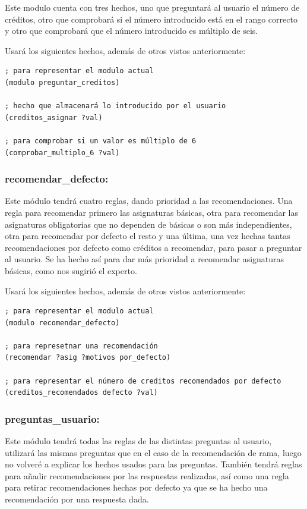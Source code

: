 \documentclass[12pt, spanish]{article}
\begin{document}
Este modulo cuenta con tres hechos, uno que preguntará al usuario el número de créditos, otro que comprobará si el número introducido está en el rango correcto y otro que comprobará que el número introducido es múltiplo de seis.

Usará los siguientes hechos, además de otros vistos anteriormente:
\begin{lstlisting}
; para representar el modulo actual
(modulo preguntar_creditos)

; hecho que almacenará lo introducido por el usuario
(creditos_asignar ?val)

; para comprobar si un valor es múltiplo de 6
(comprobar_multiplo_6 ?val)
\end{lstlisting}


\subsubsection*{recomendar\_defecto:}

Este módulo tendrá cuatro reglas, dando prioridad a las recomendaciones. Una regla para recomendar primero las asignaturas básicas, otra para recomendar las asignaturas obligatorias que no dependen de básicas o son más independientes, otra para recomendar por defecto el resto y una última, una vez hechas tantas recomendaciones por defecto como créditos a recomendar, para pasar a preguntar al usuario. Se ha hecho así para dar más prioridad a recomendar asignaturas básicas, como nos sugirió el experto.

Usará los siguientes hechos, además de otros vistos anteriormente:
\begin{lstlisting}
; para representar el modulo actual
(modulo recomendar_defecto)

; para represetnar una recomendación
(recomendar ?asig ?motivos por_defecto)

; para representar el número de creditos recomendados por defecto
(creditos_recomendados defecto ?val)
\end{lstlisting}



\subsubsection*{preguntas\_usuario:}

Este módulo tendrá todas las reglas de las distintas preguntas al usuario, utilizará las mismas preguntas que en el caso de la recomendación de rama, luego no volveré a explicar los hechos usados para las preguntas. También tendrá reglas para añadir recomendaciones por las respuestas realizadas, así como una regla para retirar recomendaciones hechas por defecto ya que se ha hecho una recomendación por una respuesta dada.
\end{document}
